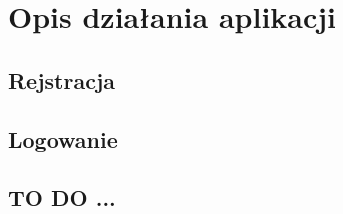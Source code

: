 \chapter{Opis działania aplikacji}
\label{cha:opisDzialaniaAplikacji}

\section{Rejstracja}
\label{sec:rejestracja}

\section{Logowanie}
\label{sec:logowanie}

\section{TO DO ...}